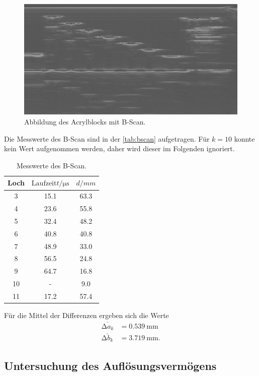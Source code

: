\begin{figure}[H]
    \centering
	\includegraphics[width=0.8\linewidth]{data/US1_daten/b_scan_u.jpg}
    \captionsetup{width=0.765\linewidth}
	\caption{Abbildung des Acrylblocks mit B-Scan.}
	\label{fig:unten}
\end{figure}

Die Messwerte des B-Scan sind in der \autoref{tab:bscan} aufgetragen. Für $k =10$ konnte kein Wert aufgenommen werden, daher wird dieser
im Folgenden ignoriert.
\begin{table}[H]
    \centering
    \caption{Messwerte des B-Scan.}
    \label{tab:bscan}
\begin{tabular}{c c c}
\toprule
Loch & $\text{Laufzeit} t / \si{\micro\second} $& $ d/ \si{mm}$\\
\midrule
 3 & 15.1 & 63.3 \\
 4 & 23.6 & 55.8 \\
 5 & 32.4 & 48.2 \\
 6 & 40.8 & 40.8 \\
 7 & 48.9 & 33.0 \\
 8 & 56.5 & 24.8 \\
 9 & 64.7 & 16.8 \\
10 & - &  9.0 \\
11 & 17.2 & 57.4 \\
\bottomrule
\end{tabular}
\end{table}

Für die Mittel der Differenzen ergeben sich die Werte
\begin{align*}
\bar{\increment a_k} &= \SI{0.539}{\milli\meter} \\
\bar{\increment b_k} &= \SI{3.719}{\milli\meter}.
\end{align*}

\subsection{Untersuchung des Auflösungsvermögens} %
\label{sec:Untersuchung des Auslösungsverfahrens}

